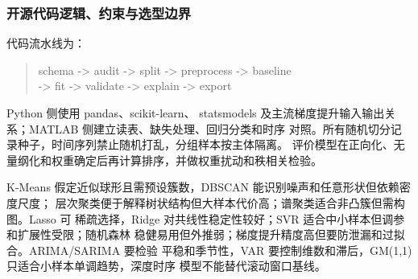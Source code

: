 \subsubsection{开源代码逻辑、约束与选型边界}

代码流水线为：
\begin{quote}
\small\ttfamily
schema -> audit -> split -> preprocess -> baseline\\
-> fit -> validate -> explain -> export
\end{quote}
Python 侧使用 pandas、scikit-learn、
statsmodels 及主流梯度提升输入输出关系；MATLAB 侧建立读表、缺失处理、回归分类和时序
对照。所有随机切分记录种子，时间序列禁止随机打乱，分组样本按主体隔离。
评价模型在正向化、无量纲化和权重确定后再计算排序，并做权重扰动和秩相关检验。

K-Means 假定近似球形且需预设簇数，DBSCAN 能识别噪声和任意形状但依赖密度尺度；
层次聚类便于解释树状结构但大样本代价高；谱聚类适合非凸簇但需构图。Lasso 可
稀疏选择，Ridge 对共线性稳定性较好；SVR 适合中小样本但调参和扩展性受限；随机森林
稳健易用但外推弱；梯度提升精度高但要防泄漏和过拟合。ARIMA/SARIMA 要检验
平稳和季节性，VAR 要控制维数和滞后，GM(1,1) 只适合小样本单调趋势，深度时序
模型不能替代滚动窗口基线。

